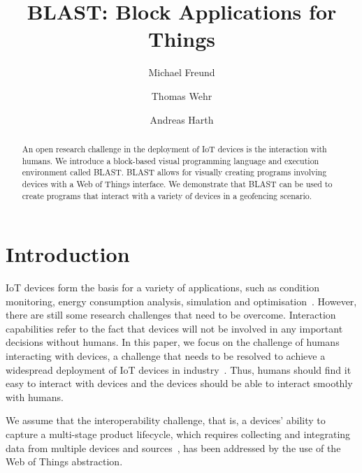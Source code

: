\documentclass[runningheads]{llncs}
\begin{document}
%
\title{BLAST: Block Applications for Things}
%
%
\author{Michael Freund \and
Thomas Wehr \and
Andreas Harth}
%
%
%
\maketitle              %
%
\begin{abstract}
  An open research challenge in the deployment of IoT devices is the interaction with humans.
  We introduce a block-based visual programming language and execution environment called BLAST.
  BLAST allows for visually creating programs involving devices with a Web of Things interface.
  We demonstrate that BLAST can be used to create programs that interact with a variety of devices in a geofencing scenario.
\end{abstract}
%
%
%
\setcounter{footnote}{0}
\section{Introduction}
IoT devices form the basis for a variety of applications, such as condition monitoring, energy consumption analysis, simulation and optimisation~\cite{CIMINO2019103130}.
However, there are still some research challenges that need to be overcome.
Interaction capabilities refer to the fact that devices will not be involved in any important decisions without humans.
In this paper, we focus on the challenge of humans interacting with devices, a challenge that needs to be resolved to achieve a widespread deployment of IoT devices in industry~\cite{KUEHNER20211227}.
Thus, humans should find it easy to interact with devices and the devices should be able to interact smoothly with humans.

We assume that the interoperability challenge, that is, a devices' ability to capture a multi-stage product lifecycle, which requires collecting and integrating data from multiple devices and sources~\cite{SEMERARO2021103469}, has been addressed by the use of the Web of Things abstraction.
\end{document}
